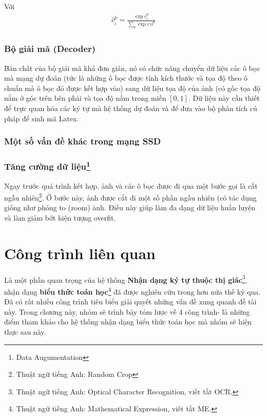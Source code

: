 \documentclass[a4paper,12pt]{article}
\begin{document}
	Với \begin{align}\hat{c}_i^p = \frac{\exp{c_i^p}}{\sum_p \exp{c)i^p}}\end{align}
	
	\subsubsection{Bộ giải mã (Decoder)}
	
	Bản chất của bộ giải mã khá đơn giản, nó có chức năng chuyển dữ liệu các ô bọc mà mạng dự đoán (tức là những ô bọc được tính kích thước và tọa độ theo ô chuẩn mà ô bọc đó được kết hợp vào) sang dữ liệu tọa độ của ảnh (có gốc tọa độ nằm ở góc trên bên phải và tọa độ nằm trong miền $[0, 1]$. Dữ liệu này cần thiết để trực quan hóa các ký tự mà hệ thống dự đoán và để đưa vào bộ phân tích cú pháp để sinh mã Latex.
	
	\subsubsection{Một số vấn đề khác trong mạng SSD\cite{liu2016ssd}}
	\subsubsection*{Tăng cường dữ liệu\footnote{Data Augumentation}}
	
	Ngay trước quá trình kết hợp, ảnh và các ô bọc được đi qua một bước gọi là cắt ngẫu nhiên\footnote{Thuật ngữ tiếng Anh: Random Crop}. Ở bước này, ảnh được cắt đi một số phần ngẫu nhiên (có tác dụng giống như phóng to (zoom) ảnh. Điều này giúp làm đa dạng dữ liệu huấn luyện và làm giảm bớt hiện tượng overfit.
	
	
	
	
	
	\newpage
	\section{Công trình liên quan}
	Là một phần quan trọng của hệ thống \textbf{Nhận dạng ký tự thuộc thị giác}\footnote{Thuật ngữ tiếng Anh: Optical Character Recognition, viết tắt OCR.}, nhận dạng \textbf{biểu thức toán học}\footnote{Thuật ngữ tiếng Anh: Mathematical Expression, viết tắt ME.} đã được nghiên cứu trong hơn nửa thế kỷ qua. Đã có rất nhiều công trình tiêu biểu giải quyết những vấn đề xung quanh đề tài này. Trong chương này, nhóm sẽ trình bày tóm lược về 4 công trình- là những điểm tham khảo cho hệ thống nhận dạng biểu thức toán học mà nhóm sẽ hiện thực sau này.\\
\end{document}
